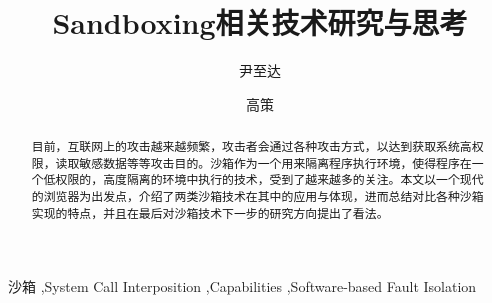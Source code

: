 \documentclass[preprint,12pt]{elsarticle}
\begin{document}
\begin{frontmatter}



\title{Sandboxing相关技术研究与思考}


\author{尹至达}
\author{高策}

\address{上海交通大学软件学院}

\begin{abstract}

目前，互联网上的攻击越来越频繁，攻击者会通过各种攻击方式，以达到获取系统高权限，读取敏感数据等等攻击目的。沙箱作为一个用来隔离程序执行环境，使得程序在一个低权限的，高度隔离的环境中执行的技术，受到了越来越多的关注。本文以一个现代的浏览器为出发点，介绍了两类沙箱技术在其中的应用与体现，进而总结对比各种沙箱实现的特点，并且在最后对沙箱技术下一步的研究方向提出了看法。

\end{abstract}

\begin{keyword}



沙箱 \sep System Call Interposition \sep Capabilities \sep Software-based Fault Isolation

\end{keyword}

\end{frontmatter}
\end{document}
